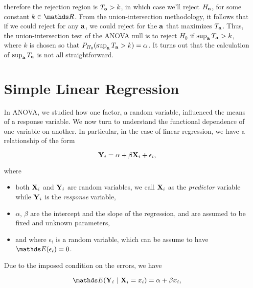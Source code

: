 \documentclass{homework}
\begin{document}
therefore the rejection region is $T_{\bf a} > k$, in which case we'll reject $H_{\bf a}$, for some constant $k \in \R$. From the union-intersection methodology, it follows that if we could reject for any ${\bf a}$, we could reject for the ${\bf a}$ that maximizes $T_{\bf a}$. Thus, the union-intersection test of the ANOVA null is to reject $H_0$ if $\sup_{\bf a} T_{\bf a} > k$, where $k$ is chosen so that $P_{H_0} (\sup_{\bf a} T_{\bf a} > k) = \alpha$. It turns out that the calculation of $\sup_{\bf a} T_{\bf a} $ is not all straightforward. \\

\clearpage

\section{Simple Linear Regression}

In ANOVA, we studied how one factor, a random variable, influenced the means of a response variable. We now turn to understand the functional dependence of one variable on another. In particular, in the case of linear regression, we have a relationship of the form

\begin{equation}
{\bf Y}_i = \alpha + \beta {\bf X}_i + \epsilon_i,
\label{linear regression 1}
\end{equation}

where 

\begin{itemize}
    \item both ${\bf X}_i$ and ${\bf Y}_i$ are random variables, we call ${\bf X}_i$ as the \textit{predictor} variable while ${\bf Y}_i$ is the \textit{response} variable, 
    \item $\alpha$, $\beta$ are the intercept and the slope of the regression, and are assumed to be fixed and unknown parameters, 
    \item and where $\epsilon_i$ is a random variable, which can be assume to have $\E(\epsilon_i) = 0$. \\
\end{itemize}

Due to the imposed condition on the errors, we have 

\begin{equation}
\E ({\bf Y}_i\blank|\blank{\bf X}_i = x_i) = \alpha + \beta x_i,
\label{linear regression 2}
\end{equation}
\end{document}
